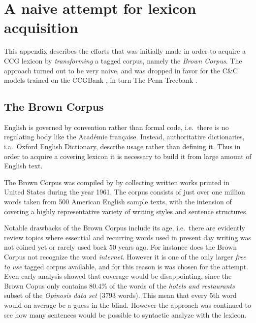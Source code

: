 \chapter{A naive attempt for lexicon acquisition}
\label{chap:brownCorpus}

This appendix describes the efforts that was initially made in order to acquire a CCG lexicon by \emph{transforming} a tagged corpus, namely the \emph{Brown Corpus}. The approach turned out to be very naive, and was dropped in favor for the C\&C models trained on the CCGBank \cite{ccgBank}, in turn The Penn Treebank \cite{pennTreebank}.

\section*{The Brown Corpus}
English is governed by convention rather than formal code, i.e.\ there is no regulating body like the Académie française. Instead, authoritative dictionaries, i.a.\  Oxford English Dictionary, describe usage rather than defining it. Thus in order to acquire a covering lexicon it is necessary to build it from large amount of English text.

The Brown Corpus was compiled by \citeauthor{brown}  by collecting written works printed in United States during the year 1961. The corpus consists of just over one million words taken from 500 American English sample texts, with the intension of covering a highly representative variety of writing styles and sentence structures.

Notable drawbacks of the Brown Corpus include its age, i.e.\ there are evidently review topics where essential and recurring words used in present day writing was not coined yet or rarely used back 50 years ago. For instance does the Brown Corpus not recognize the word \emph{internet}. However it is one of the only larger \emph{free to use} tagged corpus available, and for this reason is was chosen for the attempt. Even early analysis showed that coverage would be disappointing, since the Brown Copus only contains 80.4\% of the words of the \emph{hotels and restaurants} subset of the \emph{Opinosis data set} \cite{Opinosis} ($\num{3793}$ words). This mean that every 5th word would on average be a guess in the blind. However the approach was continued to see how many sentences would be possible to syntactic analyze with the lexicon.

